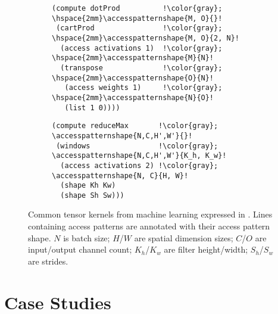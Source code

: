 \begin{figure*}
\begin{minipage}{.45\textwidth}
\begin{subfigure}{\textwidth}
\begin{lstlisting}[basicstyle=\footnotesize,escapechar=!]
(compute dotProd          !\color{gray}; \hspace{2mm}\accesspatternshape{M, O}{}!
 (cartProd                !\color{gray}; \hspace{2mm}\accesspatternshape{M, O}{2, N}!
  (access activations 1)  !\color{gray}; \hspace{2mm}\accesspatternshape{M}{N}!
  (transpose              !\color{gray}; \hspace{2mm}\accesspatternshape{O}{N}!
   (access weights 1)     !\color{gray}; \hspace{2mm}\accesspatternshape{N}{O}!
   (list 1 0))))
  \end{lstlisting}
  \vspace{-1.5em} 
  \label{fig:mat-mat-mult}
\end{subfigure}

\begin{subfigure}{\textwidth}
\begin{lstlisting}[basicstyle=\footnotesize,escapechar=!]
(compute reduceMax       !\color{gray}; \accesspatternshape{N,C,H',W'}{}!
 (windows                !\color{gray}; \accesspatternshape{N,C,H',W'}{K_h, K_w}!
  (access activations 2) !\color{gray}; \accesspatternshape{N, C}{H, W}!
  (shape Kh Kw)
  (shape Sh Sw)))
\end{lstlisting}
  \vspace{-1em} 
  \label{fig:maxpool-code}
\end{subfigure}

\end{minipage}
\caption{Common tensor kernels from machine learning expressed in \g. Lines containing access patterns are annotated with their access pattern shape.
$N$ is batch size; $H$/$W$ are spatial dimension sizes; $C$/$O$ are input/output channel count; $K_h$/$K_w$ are filter height/width; $S_h$/$S_w$ are strides.
}
\label{fig:all-kernels}
\end{figure*}

\section{Case Studies}
\label{sec:case-studies}

